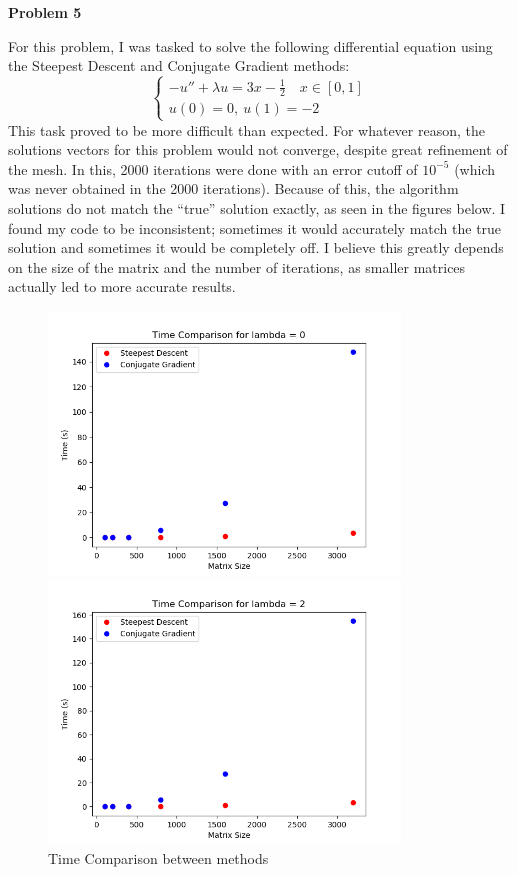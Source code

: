 \documentclass{article}
\newcommand{\Problem}[1]{\textbf{\large Problem #1}}
\begin{document}
\Problem{5}

For this problem, I was tasked to solve the following differential equation using the Steepest Descent and Conjugate Gradient methods:
$$\begin{cases} -u'' + \lambda u = 3x - \frac{1}{2} \quad x\in [0,1] \\ u(0) = 0,\ u(1) = -2 \end{cases}$$
This task proved to be more difficult than expected. 
For whatever reason, the solutions vectors for this problem would not converge, despite great refinement of the mesh. 
In this, 2000 iterations were done with an error cutoff of $10^{-5}$ (which was never obtained in the 2000 iterations). 
Because of this, the algorithm solutions do not match the ``true'' solution exactly, as seen in the figures below. 
I found my code to be inconsistent; sometimes it would accurately match the true solution and sometimes it would be completely off. 
I believe this greatly depends on the size of the matrix and the number of iterations, as smaller matrices actually led to more accurate results. 

\begin{figure}[H]
\centering
\caption{Time Comparison between methods}
\begin{minipage}[b]{0.4\textwidth}
\includegraphics[height=7cm]{time0}	
\end{minipage}
\hspace{0.6in}
\begin{minipage}[b]{0.4\textwidth}
\centering
\includegraphics[height=7cm]{time2}	
\end{minipage}
\end{figure}
\end{document}
